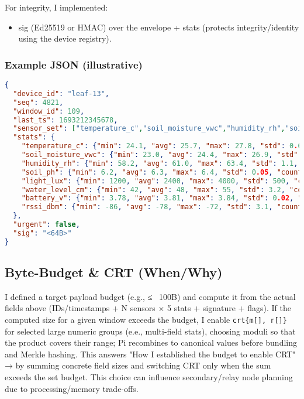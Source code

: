 \documentclass[12pt]{article}
\begin{document}
For integrity, I implemented:

\begin{itemize}
\item sig (Ed25519 or HMAC) over the envelope + stats (protects integrity/identity using the device registry).
\end{itemize}

\subsubsection{Example JSON (illustrative)}

\begin{lstlisting}[language=json, basicstyle=\footnotesize\ttfamily]
{
  "device_id": "leaf-13",
  "seq": 4821,
  "window_id": 109,
  "last_ts": 1693212345678,
  "sensor_set": ["temperature_c","soil_moisture_vwc","humidity_rh","soil_ph","light_lux","water_level_cm","battery_v","rssi_dbm"],
  "stats": {
    "temperature_c": {"min": 24.1, "avg": 25.7, "max": 27.8, "std": 0.6, "count": 36},
    "soil_moisture_vwc": {"min": 23.0, "avg": 24.4, "max": 26.9, "std": 0.8, "count": 36},
    "humidity_rh": {"min": 58.2, "avg": 61.0, "max": 63.4, "std": 1.1, "count": 36},
    "soil_ph": {"min": 6.2, "avg": 6.3, "max": 6.4, "std": 0.05, "count": 36},
    "light_lux": {"min": 1200, "avg": 2400, "max": 4000, "std": 500, "count": 36},
    "water_level_cm": {"min": 42, "avg": 48, "max": 55, "std": 3.2, "count": 36},
    "battery_v": {"min": 3.78, "avg": 3.81, "max": 3.84, "std": 0.02, "count": 36},
    "rssi_dbm": {"min": -86, "avg": -78, "max": -72, "std": 3.1, "count": 6}
  },
  "urgent": false,
  "sig": "<64B>"
}
\end{lstlisting}

\subsection{Byte-Budget \& CRT (When/Why)}

I defined a target payload budget (e.g., ≤ ~100B) and compute it from the actual fields above (IDs/timestamps + N sensors × 5 stats + signature + flags). If the computed size for a given window exceeds the budget, I enable \texttt{crt\{m[], r[]\}} for selected large numeric groups (e.e., multi-field stats), choosing moduli so that the product covers their range; Pi recombines to canonical values before bundling and Merkle hashing. This answers "How I established the budget to enable CRT" → by summing concrete field sizes and switching CRT only when the sum exceeds the set budget. This choice can influence secondary/relay node planning due to processing/memory trade-offs.
\end{document}
